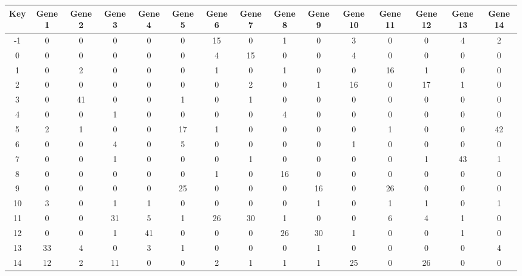 \begin{tabular}{|c|c|c|c|c|c|c|c|c|c|c|c|c|c|c|}
\hline
Key & Gene 1 & Gene 2 & Gene 3 & Gene 4 & Gene 5 & Gene 6 & Gene 7 & Gene 8 & Gene 9 & Gene 10 & Gene 11 & Gene 12 & Gene 13 & Gene 14 \\
\hline
-1 & 0 & 0 & 0 & 0 & 0 & 15 & 0 & 1 & 0 & 3 & 0 & 0 & 4 & 2 \\
0 & 0 & 0 & 0 & 0 & 0 & 4 & 15 & 0 & 0 & 4 & 0 & 0 & 0 & 0 \\
1 & 0 & 2 & 0 & 0 & 0 & 1 & 0 & 1 & 0 & 0 & 16 & 1 & 0 & 0 \\
2 & 0 & 0 & 0 & 0 & 0 & 0 & 2 & 0 & 1 & 16 & 0 & 17 & 1 & 0 \\
3 & 0 & 41 & 0 & 0 & 1 & 0 & 1 & 0 & 0 & 0 & 0 & 0 & 0 & 0 \\
4 & 0 & 0 & 1 & 0 & 0 & 0 & 0 & 4 & 0 & 0 & 0 & 0 & 0 & 0 \\
5 & 2 & 1 & 0 & 0 & 17 & 1 & 0 & 0 & 0 & 0 & 1 & 0 & 0 & 42 \\
6 & 0 & 0 & 4 & 0 & 5 & 0 & 0 & 0 & 0 & 1 & 0 & 0 & 0 & 0 \\
7 & 0 & 0 & 1 & 0 & 0 & 0 & 1 & 0 & 0 & 0 & 0 & 1 & 43 & 1 \\
8 & 0 & 0 & 0 & 0 & 0 & 1 & 0 & 16 & 0 & 0 & 0 & 0 & 0 & 0 \\
9 & 0 & 0 & 0 & 0 & 25 & 0 & 0 & 0 & 16 & 0 & 26 & 0 & 0 & 0 \\
10 & 3 & 0 & 1 & 1 & 0 & 0 & 0 & 0 & 1 & 0 & 1 & 1 & 0 & 1 \\
11 & 0 & 0 & 31 & 5 & 1 & 26 & 30 & 1 & 0 & 0 & 6 & 4 & 1 & 0 \\
12 & 0 & 0 & 1 & 41 & 0 & 0 & 0 & 26 & 30 & 1 & 0 & 0 & 1 & 0 \\
13 & 33 & 4 & 0 & 3 & 1 & 0 & 0 & 0 & 1 & 0 & 0 & 0 & 0 & 4 \\
14 & 12 & 2 & 11 & 0 & 0 & 2 & 1 & 1 & 1 & 25 & 0 & 26 & 0 & 0 \\
\hline
\end{tabular}